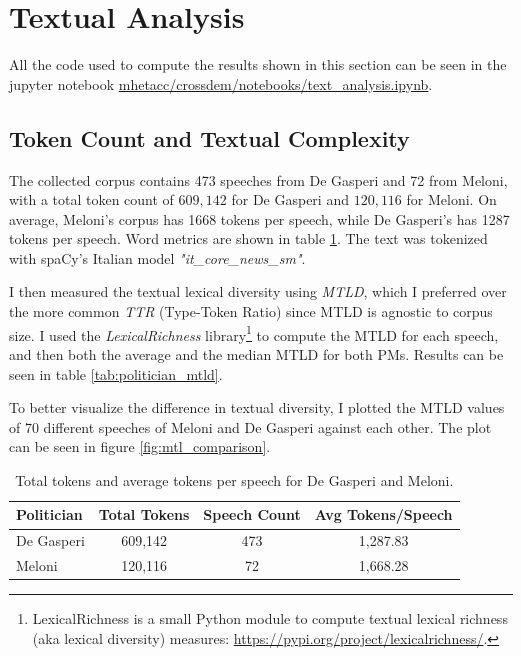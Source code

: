 \section{Textual Analysis}

All the code used to compute the results shown in this section can be seen in the jupyter notebook \href{https://github.com/mhetacc/crossdem/blob/c8f677e7a3a06ddcf2b7fdf29a825f2f27217637/notebooks/text_analysis.ipynb}{mhetacc/crossdem/notebooks/text\_analysis.ipynb}.


\subsection{Token Count and Textual Complexity}

The collected corpus contains 473 speeches from De Gasperi and 72 from Meloni, with a total token count of $609,142$ for De Gasperi and $120,116$ for Meloni.
On average, Meloni's corpus has 1668 tokens per speech, while De Gasperi's has 1287 tokens per speech. Word metrics are shown in table \ref{tab:politician_tokens}.
The text was tokenized with spaCy's Italian model \textit{"it\_core\_news\_sm"}.

I then measured the textual lexical diversity using \textit{MTLD}, which I preferred over the more common \textit{TTR} (Type-Token Ratio) since MTLD is agnostic to corpus size. I used the \textit{LexicalRichness} library\footnote{LexicalRichness is a small Python module to compute textual lexical richness (aka lexical diversity) measures: \url{https://pypi.org/project/lexicalrichness/}.} to compute the MTLD for each speech, and then both the average and the median MTLD for both PMs. Results can be seen in table \ref{tab:politician_mtld}.

To better visualize the difference in textual diversity, I plotted the MTLD values of 70 different speeches of Meloni and De Gasperi against each other. The plot can be seen in figure \ref{fig:mtl_comparison}.


\begin{table}[h]
    \centering
    \caption{Total tokens and average tokens per speech for De Gasperi and Meloni.}
    \label{tab:politician_tokens}
    \begin{tabular}{lccc}
        \toprule
        \textbf{Politician} & \textbf{Total Tokens} & \textbf{Speech Count} & \textbf{Avg Tokens/Speech} \\
        \midrule
        De Gasperi           & 609,142               & 473                   & 1,287.83                   \\
        Meloni              & 120,116               & 72                    & 1,668.28                   \\
        \bottomrule
    \end{tabular}
\end{table}


